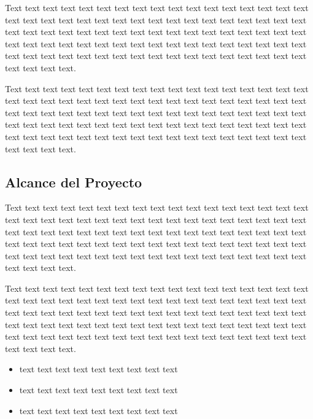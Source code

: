 \documentclass[12pt,a4paper]{article}
\begin{document}
Text text text text text text text text text text text text text text text text text text text text text text text text text text text text text text text text text text text text text text text text text text text text text text text text text text text text text text text text text text text text text text text text text text text text text text text text text text text text text text text text text text text text text text text text text.

Text text text text text text text text text text text text text text text text text text text text text text text text text text text text text text text text text text text text text text text text text text text text text text text text text text text text text text text text text text text text text text text text text text text text text text text text text text text text text text text text text text text text text text text text text.
\subsection{Alcance del Proyecto}
\label{sec:6}
Text text text text text text text text text text text text text text text text text text text text text text text text text text text text text text text text text text text text text text text text text text text text text text text text text text text text text text text text text text text text text text text text text text text text text text text text text text text text text text text text text text text text text text text text text.

Text text text text text text text text text text text text text text text text text text text text text text text text text text text text text text text text text text text text text text text text text text text text text text text text text text text text text text text text text text text text text text text text text text text text text text text text text text text text text text text text text text text text text text text text text.

\begin{itemize}
  \item text text text text text text text text text
  \item text text text text text text text text text
  \item text text text text text text text text text
\end{itemize}
\end{document}
